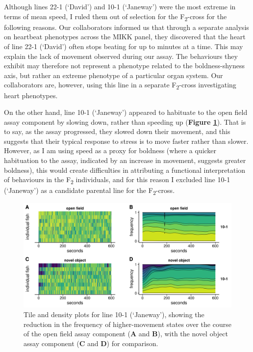 \documentclass[
]{book}
\begin{document}
Although lines \textcolor{22-1 (‘David’)_FB737A}{22-1 (‘David’)} and \textcolor{10-1 (‘Janeway’)_F8766D}{10-1 (‘Janeway’)} were the most extreme in terms of mean speed, I ruled them out of selection for the F\textsubscript{2}-cross for the following reasons. Our collaborators informed us that through a separate analysis on heartbeat phenotypes across the MIKK panel, they discovered that the heart of line \textcolor{22-1 (‘David’)_FB737A}{22-1 (‘David’)} often stops beating for up to minutes at a time. This may explain the lack of movement observed during our assay. The behaviours they exhibit may therefore not represent a phenotype related to the boldness-shyness axis, but rather an extreme phenotype of a particular organ system. Our collaborators are, however, using this line in a separate F\textsubscript{2}-cross investigating heart phenotypes.

On the other hand, line \textcolor{10-1 (‘Janeway’)_F8766D}{10-1 (‘Janeway’)} appeared to habituate to the open field assay component by slowing down, rather than speeding up (\textbf{Figure \ref{fig:10-1-dens}}). That is to say, as the assay progressed, they slowed down their movement, and this suggests that their typical response to stress is to move faster rather than slower. However, as I am using speed as a proxy for boldness (where a quicker habituation to the assay, indicated by an increase in movement, suggests greater boldness), this would create difficulties in attributing a functional interpretation of behaviours in the F\textsubscript{2} individuals, and for this reason I excluded line \textcolor{10-1 (‘Janeway’)_F8766D}{10-1 (‘Janeway’)} as a candidate parental line for the F\textsubscript{2}-cross.



\begin{figure}
\includegraphics[width=1\linewidth]{figs/mikk_behaviour/select_0.08_15_10-1_dge} \caption{Tile and density plots for line \textcolor{10-1 (‘Janeway’)_F8766D}{10-1 (‘Janeway’)}, showing the reduction in the frequency of higher-movement states over the course of the open field assay component (\textbf{A} and \textbf{B}), with the novel object assay component (\textbf{C} and \textbf{D}) for comparison.}\label{fig:10-1-dens}
\end{figure}
\end{document}
